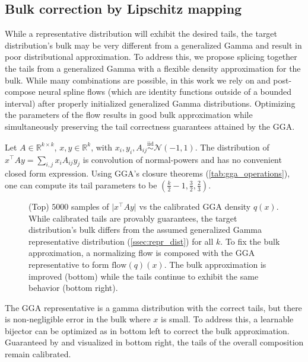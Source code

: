 \documentclass[../thesis.tex]{subfiles}
\begin{document}
\subsection{Bulk correction by Lipschitz mapping}

While a representative distribution will exhibit the desired tails,
the target distribution's bulk may be very different from a generalized Gamma and result in poor distributional approximation. To address this, we propose splicing together the tails from a generalized Gamma with a flexible density approximation for the bulk.
While many combinations are possible, in this work we rely on  and post-compose neural
spline flows \citep{durkan2019neural} (which are identity functions outside of a bounded interval) after
properly initialized generalized Gamma distributions.
Optimizing the parameters of the flow results in good bulk approximation while simultaneously
preserving the tail correctness guarantees attained by the GGA.

\begin{example}
  Let $A \in \mathbb{R}^{k \times k}$, $x,y\in\mathbb{R}^k$, with $x_i,y_i,A_{ij} \overset{\text{iid}}{\sim} \mathcal{N}(-1,1)$.
  The distribution of $x^\top A y = \sum_{i,j} x_i A_{ij} y_j$ is convolution of normal-powers \citep{gupta2008analyzing} and has no convenient
  closed form expression.
  Using GGA's closure theorems (\cref{tab:gga_operations}), one can compute
  its tail parameters to be $(\frac{k}{2}-1,\frac{3}{2}, \frac{2}{3})$.

  \begin{figure}[h]
    \centering
    
    
    \caption{(Top) $5000$ samples of $\lvert x^\top A y \rvert$ vs the
      calibrated GGA density $q(x)$. While calibrated tails are provably guarantees,
      the target distribution's bulk differs from the assumed generalized Gamma representative distribution (\cref{ssec:repr_dist}) for all $k$.
      To fix the bulk approximation, a normalizing flow is composed with
      the GGA representative to form $\text{flow}(q)(x)$. The bulk approximation
      is improved (bottom) while the tails continue to exhibit the same
      behavior (bottom right).
    }
    \label{fig:power_normal}
  \end{figure}

  The GGA representative is a gamma distribution with the correct tails, but there is non-negligible error in the bulk where $x$ is small. To address this, a learnable bijector can be
  optimized as in  bottom left to correct the bulk approximation. Guaranteed by  and
  visualized in  bottom right, the tails of the overall composition remain calibrated.
\end{example}
\end{document}
